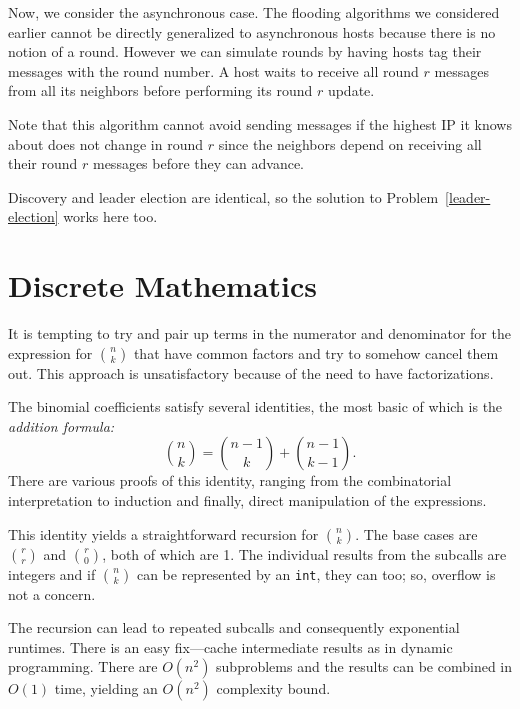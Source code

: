 Now, we consider the asynchronous case. The flooding
algorithms we considered earlier cannot be directly
generalized to asynchronous hosts because there
is no notion of a round.  However we can simulate
rounds by having hosts tag their messages with
the round number. A host waits to receive
all round $r$ messages from all its neighbors before
performing its round $r$ update. 

Note that this algorithm cannot avoid sending messages if
the highest IP it knows about does not change in round $r$
since the neighbors depend on receiving all their round $r$
messages before they can advance.  

Discovery and leader election are identical, so the solution to 
Problem~\ref{leader-election} works here too.

\chapter{ Discrete Mathematics}

It is tempting to try and pair up terms in the numerator and denominator for the
expression for  $\binom{n}{k}$ that have common factors and try to somehow  cancel them out.
This approach is unsatisfactory because of the need to have factorizations.

The binomial coefficients satisfy several identities, the most basic of which is the {\em addition
formula:}
\[
 \binom{n}{k} =  \binom{n-1}{k} +  \binom{n-1}{k-1} .
\]
There are various proofs of this identity, ranging from the combinatorial interpretation
to induction and finally, direct manipulation of the expressions.

This identity yields a straightforward recursion for $\binom{n}{k}$. 
The base cases are  $\binom{r}{r}$ and  $\binom{r}{0}$, both of which are 1.
The individual results from
the subcalls are integers and if  $\binom{n}{k}$ can be represented by an \texttt{int}, they can too; so, overflow is not a concern.

The recursion can lead to repeated subcalls and consequently exponential runtimes. There is
an easy fix---cache intermediate results as in dynamic programming. There are
$O(n^2)$ subproblems and the results can be combined in $O(1)$ time, yielding an $O(n^2)$ complexity bound.

